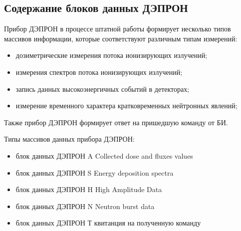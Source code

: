  
\subsection{Содержание блоков данных ДЭПРОН}

Прибор ДЭПРОН в процессе штатной работы формирует несколько типов массивов информации, которые соответствуют различным типам измерений:


\begin{itemize}
	\item 	дозиметрические измерения потока ионизирующих излучений;
	
	
	\item 	измерения спектров потока ионизирующих излучений;
	
	
	\item 	запись данных высокоэнергичных событий в детекторах;
	
	
	\item 	измерение временного характера кратковременных нейтронных явлений;
	
	
\end{itemize}
Также прибор ДЭПРОН формирует ответ на пришедшую команду от БИ.





Типы массивов данных прибора ДЭПРОН:


\begin{itemize}
	\item 	блок данных ДЭПРОН  A  		Collected dose and fluxes values
	
	
	\item 	блок данных ДЭПРОН  S 		Energy deposition spectra
	
	
	\item 	блок данных ДЭПРОН  H  		High Amplitude Data
	
	
	\item 	блок данных ДЭПРОН  N		Neutron burst data
	
	
	\item 	блок данных ДЭПРОН  Т		квитанция на полученную команду
	

\end{itemize}

